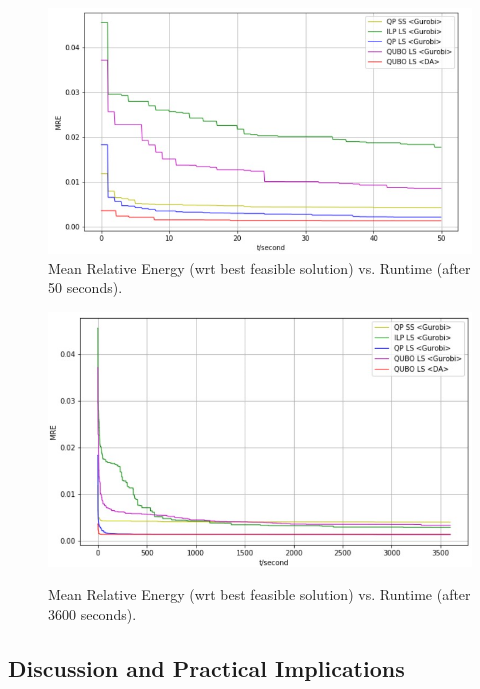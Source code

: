 \documentclass[preprint,12pt]{elsarticle}
\begin{document}
\begin{figure}[t]%
	
	\includegraphics[width=\textwidth]{energy_50.png}  
	\caption{Mean Relative Energy (wrt best feasible solution) vs. Runtime (after 50 seconds).}%
	
	\label{fig:results1}%
\end{figure}

\begin{figure}[t]%
	
	\includegraphics[width=\textwidth]{energy_3600.png}   \\%
	\caption{Mean Relative Energy (wrt best feasible solution) vs. Runtime (after 3600 seconds).}%
	
	\label{fig:results2}%
\end{figure}



\subsection{Discussion and Practical Implications}
\end{document}
